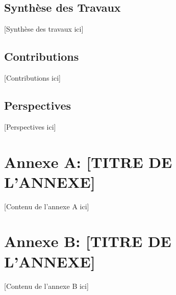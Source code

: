 \documentclass[12pt,a4paper]{report}
\begin{document}
\section{Synthèse des Travaux}
[Synthèse des travaux ici]

\section{Contributions}
[Contributions ici]

\section{Perspectives}
[Perspectives ici]




\begin{appendices}
\chapter{Annexe A: [TITRE DE L'ANNEXE]}
[Contenu de l'annexe A ici]

\chapter{Annexe B: [TITRE DE L'ANNEXE]}
[Contenu de l'annexe B ici]
\end{appendices}
\end{document}
